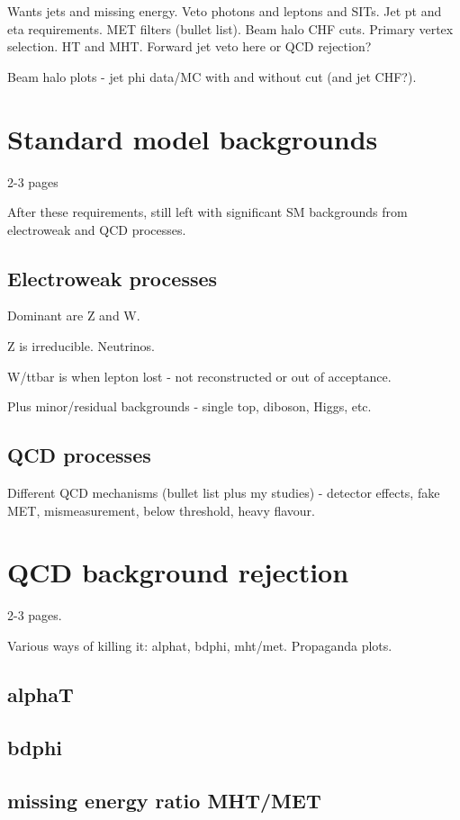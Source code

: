 Wants jets and missing energy. Veto photons and leptons and SITs. Jet pt and 
eta requirements. MET filters (bullet list). Beam halo CHF cuts. Primary vertex 
selection. HT and MHT. Forward jet veto here or QCD rejection?

Beam halo plots - jet phi data/MC with and without cut (and jet CHF?).


\section{Standard model backgrounds}
2-3 pages

After these requirements, still left with significant SM backgrounds from 
electroweak and QCD processes.

\subsection{Electroweak processes}

Dominant are Z and W.
	
Z is irreducible. Neutrinos.
	
W/ttbar is when lepton lost - not reconstructed or out of acceptance.
	
Plus minor/residual backgrounds - single top, diboson, Higgs, etc.
	
\subsection{QCD processes}

Different QCD mechanisms (bullet list plus my studies) - detector effects, fake 
MET, mismeasurement, below threshold, heavy flavour.

\section{QCD background rejection}
2-3 pages.

Various ways of killing it: alphat, bdphi, mht/met.
Propaganda plots.

\subsection{alphaT}

\subsection{bdphi}

\subsection{missing energy ratio MHT/MET}

